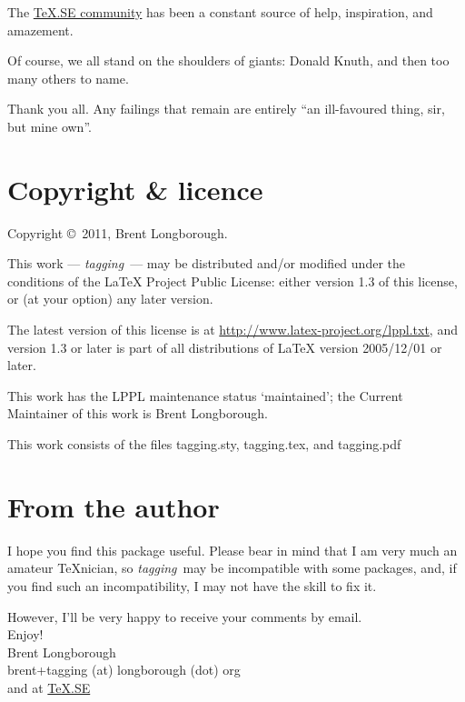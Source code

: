 \documentclass[a4paper,12pt,twoside,openany]{memoir}
\newcommand{\tpname}{\textsf{\itshape tagging}}
\begin{document}
The \href{http://tex.stackexchange.com}{\TeX.SE community}
has been a constant source of help, inspiration, and amazement.

Of course, we all stand on the shoulders of giants: Donald Knuth,
and then too many others to name.

Thank you all. Any failings that remain are entirely
``an ill-favoured thing, sir, but mine own''.

\section{Copyright \& licence}
Copyright \copyright\ 2011, Brent Longborough.

This work --- \tpname\ --- may be distributed and/or modified under the
conditions of the LaTeX Project Public License: either version 1.3
of this license, or (at your option) any later version.

The latest version of this license is at
\url{http://www.latex-project.org/lppl.txt},
and version 1.3 or later is part of all distributions of \LaTeX
version 2005/12/01 or later.

This work has the LPPL maintenance status `maintained';
the Current Maintainer of this work is Brent Longborough.

This work consists of the files 
tagging.sty, tagging.tex, and tagging.pdf

\section{From the author}
I hope you find this package useful.
Please bear in mind that I am very much an amateur \TeX nician,
so \tpname\ may be incompatible with some packages, and,
if you find such an incompatibility, I may not have the skill to fix it.

However, I'll be very happy to receive your comments by email.\\[\baselineskip]
Enjoy!\\
Brent Longborough\\[\baselineskip]
\textsf{brent+tagging (at) longborough (dot) org}\\
and at \href{http://tex.stackexchange.com/users/344/brent-longborough}{\TeX.SE}
\end{document}
